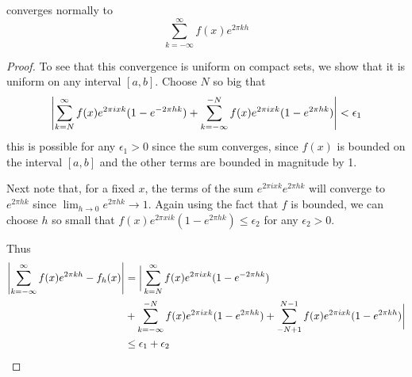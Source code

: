 \documentclass{homework}
\begin{document}
\begin{solution}
\begin{lemma}
\[                                                                                \]
                                                                                converges normally to \[\sum_{k=-\infty}^\infty f(x)e^{2\pi kh}\]
                                                                                \end{lemma}
                                                                                \begin{proof}
                                                                                To see that this convergence is uniform on compact sets, we show that it is uniform on any interval $[a, b]$. 
                                                                                Choose $N$ so big that 
                                                                                \[
                                                                                \left|\sum_{k=N}^\infty f(x)e^{2\pi i x k}(1-e^{-2\pi hk}) + 
                                                                                \sum_{k=-\infty}^{-N} f(x)e^{2\pi i x k}(1-e^{2\pi hk})\right| < \epsilon_1
                                                                                \] 
                                                                                this is possible for any $\epsilon_1>0$ since the sum converges, since $f(x)$ is bounded on the interval $[a, b]$ and the other terms are bounded in magnitude by 1. 

                                                                                Next note that, for a fixed $x$, the terms of the sum $e^{2\pi ix k}e^{2\pi h k}$ will converge to $e^{2\pi h k}$ since $\lim_{h\to 0} e^{2\pi h k}\to 1$. Again using the fact that $f$ is bounded, we can choose $h$ so small that $f(x)e^{2\pi x i k}(1-e^{2\pi h k})\leq \epsilon_2$ for any $\epsilon_2>0$.

                                                                                Thus
                                                                                \begin{align*}
                                                                                \left|\sum_{k=-\infty}^\infty f(x)e^{2\pi k h} - f_h(x)\right| &= \bigg| 
                                                                                \sum_{k=N}^\infty f(x)e^{2\pi i x k}(1-e^{-2\pi hk}) \\
                                                                                &+ \sum_{k=-\infty}^{-N} f(x)e^{2\pi i x k}(1-e^{2\pi hk}) + \sum_{-N+1}^{N-1} f(x)e^{2\pi ixk}(1-e^{2\pi kh})\bigg| \\
                                                                                &\leq \epsilon_1 + \epsilon_2
                                                                                \end{align*}


\end{proof}
\end{solution}
\end{document}
